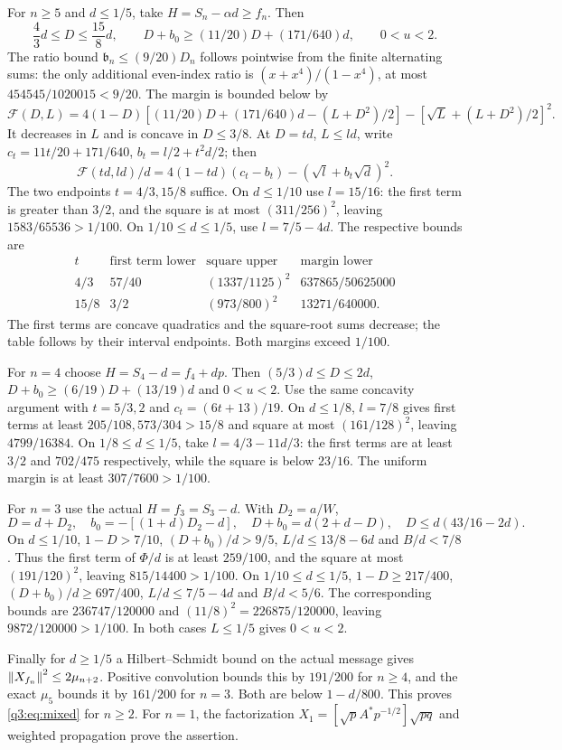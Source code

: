 For $n\ge5$ and $d\le1/5$, take $H=S_n-\alpha d\ge f_n$. Then
\[
 \frac43d\le D\le\frac{15}8d,\qquad
 D+b_0\ge(11/20)D+(171/640)d,\qquad 0<u<2.
\]
The ratio bound $\mathfrak b_n\le(9/20)D_n$ follows pointwise from the finite alternating sums: the only additional even-index ratio is $(x+x^4)/(1-x^4)$, at most $454545/1020015<9/20$. The margin is bounded below by
\[
 \mathcal F(D,L)=4(1-D)[(11/20)D+(171/640)d-(L+D^2)/2]
                  -[\sqrt L+(L+D^2)/2]^2.
\]
It decreases in $L$ and is concave in $D\le3/8$. At $D=td$, $L\le l d$, write
$c_t=11t/20+171/640$, $b_t=l/2+t^2d/2$; then
\[
 \mathcal F(td,ld)/d=4(1-td)(c_t-b_t)-(\sqrt l+b_t\sqrt d)^2.
\]
The two endpoints $t=4/3,15/8$ suffice. On $d\le1/10$ use $l=15/16$: the first term is greater than $3/2$, and the square is at most $(311/256)^2$, leaving $1583/65536>1/100$. On $1/10\le d\le1/5$, use $l=7/5-4d$. The respective bounds are
\[
\begin{array}{c|c|c|c}
t&\text{first term lower}&\text{square upper}&\text{margin lower}\\\hline
4/3&57/40&(1337/1125)^2&637865/50625000\\
15/8&3/2&(973/800)^2&13271/640000 .
\end{array}
\]
The first terms are concave quadratics and the square-root sums decrease; the table follows by their interval endpoints. Both margins exceed $1/100$.

For $n=4$ choose $H=S_4-d=f_4+dp$. Then
$(5/3)d\le D\le2d$, $D+b_0\ge(6/19)D+(13/19)d$ and $0<u<2$.
Use the same concavity argument with $t=5/3,2$ and $c_t=(6t+13)/19$. On $d\le1/8$, $l=7/8$ gives first terms at least $205/108,573/304>15/8$ and square at most $(161/128)^2$, leaving $4799/16384$. On $1/8\le d\le1/5$, take $l=4/3-11d/3$: the first terms are at least $3/2$ and $702/475$ respectively, while the square is below $23/16$. The uniform margin is at least $307/7600>1/100$.

For $n=3$ use the actual $H=f_3=S_3-d$. With $D_2=a/W$,
\[
 D=d+D_2,\quad b_0=-[(1+d)D_2-d],\quad
 D+b_0=d(2+d-D),\quad D\le d(43/16-2d).
\]
On $d\le1/10$, $1-D>7/10$, $(D+b_0)/d>9/5$, $L/d\le13/8-6d$ and $B/d<7/8$. Thus the first term of $\Phi/d$ is at least $259/100$, and the square at most $(191/120)^2$, leaving $815/14400>1/100$. On $1/10\le d\le1/5$, $1-D\ge217/400$, $(D+b_0)/d\ge697/400$, $L/d\le7/5-4d$ and $B/d<5/6$. The corresponding bounds are $236747/120000$ and $(11/8)^2=226875/120000$, leaving $9872/120000>1/100$. In both cases $L\le1/5$ gives $0<u<2$.

Finally for $d\ge1/5$ a Hilbert--Schmidt bound on the actual message gives
$\left\lVert X_{f_n}\right\rVert^2\le2\mu_{n+2}$. Positive convolution bounds this by $191/200$ for $n\ge4$, and the exact $\mu_5$ bounds it by $161/200$ for $n=3$. Both are below $1-d/800$. This proves \eqref{q3:eq:mixed} for $n\ge2$. For $n=1$, the factorization
$X_1=[\sqrt p A^*p^{-1/2}]\sqrt{pq}$ and weighted propagation prove the assertion.

